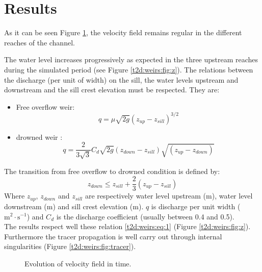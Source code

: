 \section{Results}
\bigskip
As it can be seen Figure \ref{t2d:weirs:velocity}, 
the velocity field remains regular in the different reaches of the channel.

\bigskip
The water level increases progressively as expected 
in the three upstream reaches during the simulated period 
(see Figure \ref{t2d:weirs:fig:z}). The relations between 
the discharge (per unit of width) on the sill, the water levels 
upstream and downstream and the sill crest elevation must be respected. 
They are:
\begin{itemize}
\item Free overflow weir:
\begin{equation*}
q=\mu \sqrt{2g}\left( z_{up}-z_{sill} \right)^{3/2}
\end{equation*}
\item drowned weir :
 	\begin{equation*}
q=\frac{2}{3\sqrt{3}}C_{d} \sqrt{2g}\left( z_{down}-z_{sill} \right)\sqrt{\left( z_{up}-z_{down} \right)}
\end{equation*}
\end{itemize}
The transition from free overflow to drowned condition is defined by:
\begin{equation}
  	z_{down} \leq z_{sill}+ \frac{2}{3}\left( z_{up}-z_{sill} \right)
  	\label{t2d:weirs:eq:1}
\end{equation}
Where $z_{up}$, $z_{down}$ and $z_{sill}$ are respectively 
water level upstream (m), water level downstream (m) and 
sill crest elevation (m).  $q$ is discharge per unit width 
($\text{m}^2\cdot\text{s}^{-1}$) and $C_{d}$ is the discharge coefficient 
(usually between 0.4 and 0.5).\\
The  results respect well these relation \eqref{t2d:weirs:eq:1} 
(Figure  \ref{t2d:weirs:fig:z}). Furthermore the tracer propagation is well
 carry out through internal singularities (Figure \ref{t2d:weirs:fig:tracer}).
%
\begin{figure}[!htbp]
\begin{minipage}[t]{0.50\textwidth}
 \centering
\end{minipage}%
\begin{minipage}[t]{0.50\textwidth}
 \centering
\end{minipage}
\begin{minipage}[t]{0.50\textwidth}
 \centering
\end{minipage}%
\begin{minipage}[t]{0.50\textwidth}
 \centering
\end{minipage}
 \caption{Evolution of velocity field in time.}
 \label{t2d:weirs:velocity}
\end{figure}


